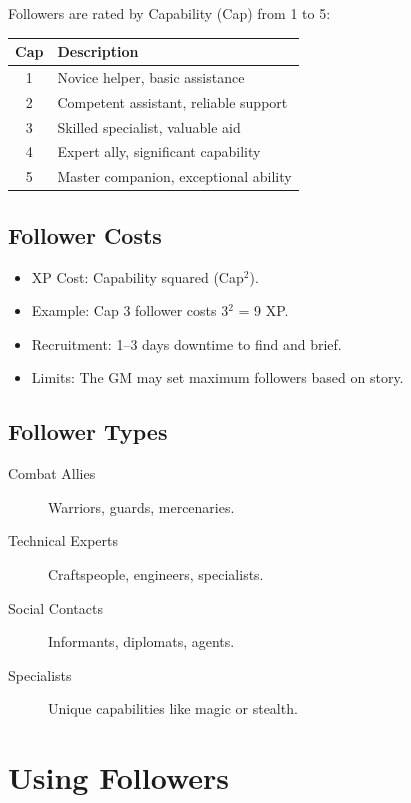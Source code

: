 \documentclass[11pt,twoside,openany]{book}
\begin{document}
Followers are rated by Capability (Cap) from 1 to 5:

\begin{center}
\begin{tabular}{|c|l|}
\hline
\textbf{Cap} & \textbf{Description} \\
\hline
1 & Novice helper, basic assistance \\
2 & Competent assistant, reliable support \\
3 & Skilled specialist, valuable aid \\
4 & Expert ally, significant capability \\
5 & Master companion, exceptional ability \\
\hline
\end{tabular}
\end{center}

\subsection*{Follower Costs}

\begin{itemize}
\item XP Cost: Capability squared (Cap$^2$).
\item Example: Cap 3 follower costs 3$^2$ = 9 XP.
\item Recruitment: 1--3 days downtime to find and brief.
\item Limits: The GM may set maximum followers based on story.
\end{itemize}

\subsection*{Follower Types}

\begin{description}
\item[Combat Allies] Warriors, guards, mercenaries.
\item[Technical Experts] Craftspeople, engineers, specialists.
\item[Social Contacts] Informants, diplomats, agents.
\item[Specialists] Unique capabilities like magic or stealth.
\end{description}

\section*{Using Followers} 
\end{document}
